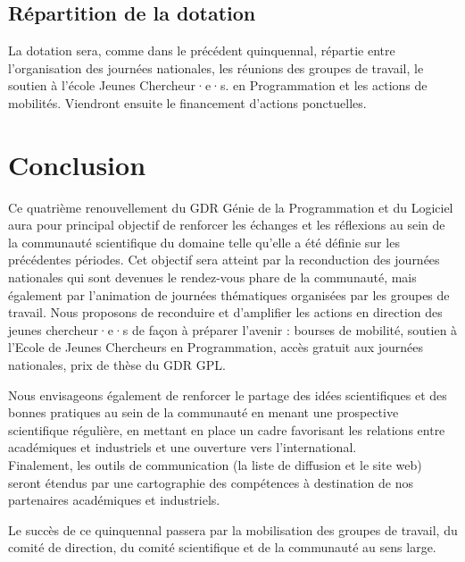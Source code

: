 \documentclass[11pt]{article}
\begin{document}
\subsection{Répartition de la dotation}

La dotation sera, comme dans le précédent quinquennal, répartie entre l'organisation des journées nationales, les réunions des groupes de travail, le soutien à l'école Jeunes Chercheur·e·s. en Programmation et les actions de mobilités. Viendront ensuite le financement d'actions ponctuelles.

\section{Conclusion}\label{conclusion}

Ce  quatrième renouvellement du GDR Génie de la Programmation et du Logiciel aura
pour principal objectif de renforcer les échanges et les réflexions au sein de
la communauté scientifique du domaine telle qu'elle a été définie sur les précédentes périodes. 
Cet objectif sera atteint par la reconduction des journées nationales qui sont
devenues le rendez-vous phare de la communauté, mais également par l'animation
de journées thématiques organisées par les groupes de travail. Nous proposons
de reconduire et d'amplifier les actions en direction des jeunes chercheur·e·s de
façon à préparer l'avenir : bourses de mobilité, soutien à l'Ecole de Jeunes
Chercheurs en Programmation, accès gratuit aux journées nationales, prix de
thèse du GDR GPL.

Nous envisageons également de renforcer le partage des idées scientifiques et
des bonnes pratiques au sein de la communauté en menant une prospective
scientifique régulière, en mettant en place un cadre favorisant les relations
entre académiques et industriels et une ouverture vers l'international.
\\

Finalement, les outils de communication (la liste de diffusion et le site web) seront étendus par une cartographie des compétences à destination de nos partenaires académiques et industriels.

Le succès de ce quinquennal passera par la mobilisation des groupes
de travail, du comité de direction, du comité scientifique et de la communauté au sens large.


\end{document}
